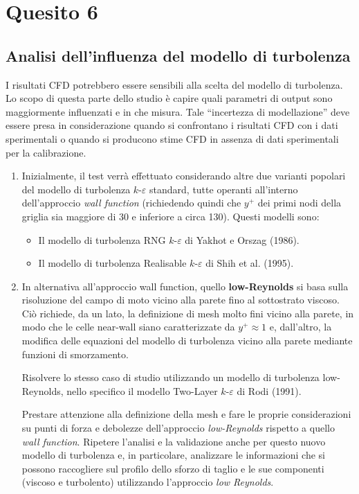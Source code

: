 
\section{Quesito 6}

\subsection*{Analisi dell'influenza del modello di turbolenza}

\vspace{0.5em}

I risultati CFD potrebbero essere sensibili alla scelta del modello di turbolenza. Lo scopo di questa parte dello studio è capire quali parametri di output sono maggiormente influenzati e in che misura. Tale ``incertezza di modellazione'' deve essere presa in considerazione quando si confrontano i risultati CFD con i dati sperimentali o quando si producono stime CFD in assenza di dati sperimentali per la calibrazione.

\begin{enumerate}
    \item Inizialmente, il test verrà effettuato considerando altre due varianti popolari del modello di turbolenza $k$-$\varepsilon$ standard, tutte operanti all'interno dell'approccio \emph{wall function} (richiedendo quindi che $y^+$ dei primi nodi della griglia sia maggiore di 30 e inferiore a circa 130).
    Questi modelli sono:
    \begin{itemize}
        \item Il modello di turbolenza RNG $k$-$\varepsilon$ di Yakhot e Orszag (1986).
        \item Il modello di turbolenza Realisable $k$-$\varepsilon$ di Shih et al. (1995).
    \end{itemize}

    \item In alternativa all'approccio wall function, quello \textbf{low-Reynolds} si basa sulla risoluzione del campo di moto vicino alla parete fino al sottostrato viscoso. Ciò richiede, da un lato, la definizione di mesh molto fini vicino alla parete, in modo che le celle near-wall siano caratterizzate da $y^+ \approx 1$ e, dall'altro, la modifica delle equazioni del modello di turbolenza vicino alla parete mediante funzioni di smorzamento.
    
    Risolvere lo stesso caso di studio utilizzando un modello di turbolenza low-Reynolds, nello specifico il modello Two-Layer $k$-$\varepsilon$ di Rodi (1991).
    
    Prestare attenzione alla definizione della mesh e fare le proprie considerazioni su punti di forza e debolezze dell'approccio \emph{low-Reynolds} rispetto a quello \emph{wall function}. Ripetere l'analisi e la validazione anche per questo nuovo modello di turbolenza e, in particolare, analizzare le informazioni che si possono raccogliere sul profilo dello sforzo di taglio e le sue componenti (viscoso e turbolento) utilizzando l'approccio \emph{low Reynolds}.
\end{enumerate}

